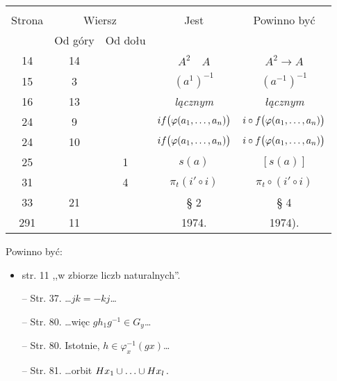 \documentclass[a4paper,11pt]{article}
\begin{document}
\begin{center}
  \begin{tabular}{|c|c|c|c|c|}
    \hline
    & \multicolumn{2}{c|}{} & & \\
    Strona & \multicolumn{2}{c|}{Wiersz} & Jest
                              & Powinno być \\ \cline{2-3}
    & Od góry & Od dołu & & \\
    \hline
    14 & 14 & & $A^{ 2 } \quad A$ & $A^{ 2 } \to A$ \\
    15 & 3 & & $( a^{ 1 } )^{ -1 }$ & $( a^{ -1 } )^{ -1 }$ \\
    16 & 13 & & \emph{lącznym} & \emph{łącznym} \\
    24 & 9 & & $if\big( \varphi( a_{ 1 }, \ldots, a_{ n } ) \big)$
           & $i \circ f\big( \varphi( a_{ 1 }, \ldots, a_{ n } ) \big)$ \\
    24 & 10 & & $if\big( \varphi( a_{ 1 }, \ldots, a_{ n } ) \big)$
           & $i \circ f\big( \varphi( a_{ 1 }, \ldots, a_{ n } ) \big)$ \\
    25 & & 1 & $s( a )$ & $[ s( a ) ]$ \\
    31 & & 4 & $\pi_{ t }( i' \circ i )$
           & $\pi_{ t } \circ ( i' \circ i )$ \\
    33 & 21 & & \S{} 2 & \S{} 4 \\
    291 & 11 & & 1974. & 1974). \\
    \hline
  \end{tabular}
\end{center}

Powinno być:
\begin{itemize}
  \item str. 11 ,,w zbiorze liczb naturalnych''.
\item[--] Str. 37. \ldots$j k = -k j$\ldots
\item[--] Str. 80. \ldots więc $g h_{ 1 } g^{ -1 } \in G_{ y }$\ldots
\item[--] Str. 80. Istotnie, $h \in \varphi_{ x }^{ -1 }( g x )$\ldots
\item[--] Str. 81. \ldots orbit
  $H x_{ 1 } \cup \ldots \cup H x_{ l } \, .$
\end{itemize}
\end{document}
